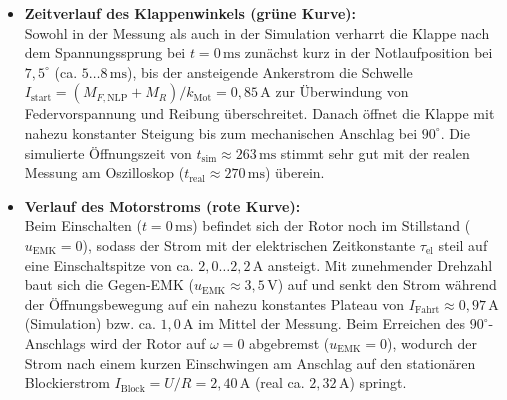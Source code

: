 \documentclass[a4paper,10pt,department=FakEI]{OTHRartcl}
\begin{document}
\begin{itemize}\setlength{\itemsep}{2pt}
    \item \textbf{Zeitverlauf des Klappenwinkels (grüne Kurve):}\\
    Sowohl in der Messung als auch in der Simulation verharrt die Klappe nach dem Spannungssprung bei $t = 0\,\text{ms}$ zunächst kurz in der Notlaufposition bei $7{,}5^\circ$ (ca. $5\dots 8\,\text{ms}$), bis der ansteigende Ankerstrom die Schwelle $I_{\text{start}} = (M_{F,\text{NLP}} + M_R)/k_{\text{Mot}} = 0{,}85\,\text{A}$ zur Überwindung von Federvorspannung und Reibung überschreitet. Danach öffnet die Klappe mit nahezu konstanter Steigung bis zum mechanischen Anschlag bei $90^\circ$. Die simulierte Öffnungszeit von $t_{\text{sim}} \approx 263\,\text{ms}$ stimmt sehr gut mit der realen Messung am Oszilloskop ($t_{\text{real}} \approx 270\,\text{ms}$) überein.
    \item \textbf{Verlauf des Motorstroms (rote Kurve):}\\
    Beim Einschalten ($t = 0\,\text{ms}$) befindet sich der Rotor noch im Stillstand ($u_{\text{EMK}} = 0$), sodass der Strom mit der elektrischen Zeitkonstante $\tau_{\text{el}}$ steil auf eine Einschaltspitze von ca. $2{,}0 \dots 2{,}2\,\text{A}$ ansteigt. Mit zunehmender Drehzahl baut sich die Gegen-EMK ($u_{\text{EMK}} \approx 3{,}5\,\text{V}$) auf und senkt den Strom während der Öffnungsbewegung auf ein nahezu konstantes Plateau von $I_{\text{Fahrt}} \approx 0{,}97\,\text{A}$ (Simulation) bzw. ca. $1{,}0\,\text{A}$ im Mittel der Messung. Beim Erreichen des $90^\circ$-Anschlags wird der Rotor auf $\omega = 0$ abgebremst ($u_{\text{EMK}} = 0$), wodurch der Strom nach einem kurzen Einschwingen am Anschlag auf den stationären Blockierstrom $I_{\text{Block}} = U/R = 2{,}40\,\text{A}$ (real ca. $2{,}32\,\text{A}$) springt.
\end{itemize}
\end{document}
